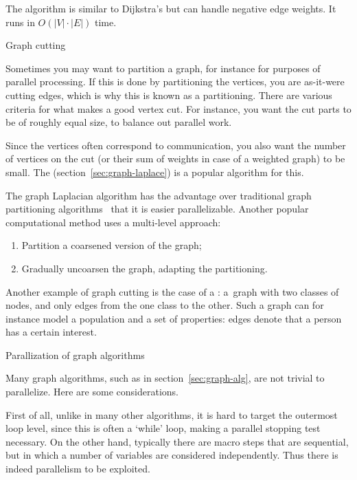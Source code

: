 The  algorithm is similar to Dijkstra's but can
handle negative edge weights.
It runs in $O\left(|V|\cdot |E|\right)$ time.

 {Graph cutting}

Sometimes you may want to partition a graph, for instance for purposes
of parallel processing. If this is done by partitioning the vertices,
you are as-it-were cutting edges, which is why this is known as a
 partitioning. There are various criteria for
what makes a good vertex cut.
For instance, you want the cut parts to
be of roughly equal size, to balance out parallel work.

Since the
vertices often correspond to communication,
you also want the number of vertices on the cut
(or their sum of weights in case of a weighted graph)
to be small.
The  (section~\ref{sec:graph-laplace})
is a popular algorithm for this.

The graph Laplacian algorithm has the advantage over
traditional graph partitioning algorithms~\cite{LiTa:separator}
that it is easier parallelizable.
Another popular computational method uses a multi-level approach:
\begin{enumerate}
\item Partition a coarsened version of the graph;
\item Gradually uncoarsen the graph, adapting the partitioning.
\end{enumerate}

Another example of graph cutting is the case of a
: a~graph with two classes of nodes,
and only edges from the one class to the other. Such a graph can for
instance model a population and a set of properties: edges denote that
a person has a certain interest.

 {Parallization of graph algorithms}

Many graph algorithms, such as in section~\ref{sec:graph-alg}, are not
trivial to parallelize. Here are some considerations.


First of all, unlike in many other algorithms, it is hard to target
the outermost loop level, since this is often a `while' loop, making a
parallel stopping test necessary.  On the other hand, typically there
are macro steps that are sequential, but in which a number of
variables are considered independently. Thus there is indeed
parallelism to be exploited.


